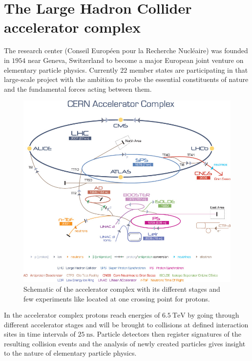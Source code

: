 \section{The Large Hadron Collider accelerator complex}\label{LHC}
The research center {\CERN} (Conseil Européen pour la Recherche Nucléaire) was founded in $1954$ near Geneva, Switzerland to become a major European joint venture on elementary particle physics. Currently $22$ member states are participating in that large-scale project with the ambition to probe the essential constituents of nature and the fundamental forces acting between them. \cite{CERNabout}\par
%
\begin{figure}[htbp]                                 
 \begin{center}                                       
  \includegraphics[width=0.8\linewidth]{figures/CERNKomplex.jpg} 
   \caption[Schematic of the {\CERN} accelerator complex.]{Schematic of the {\CERN} accelerator complex with its different stages and few experiments like {\ATLAS} located at one crossing point for protons. \cite{CERNKomplex}}
  \label{complex}                                     
 \end{center}
\end{figure}
%
In the accelerator complex protons reach energies of $\SI{6.5}{\tera\electronvolt}$ by going through different accelerator stages and will be brought to collisions at defined interaction sites in time intervals of $\SI{25}{\nano\second}$. Particle detectors then register signatures of the resulting collision events and the analysis of newly created particles gives insight to the nature of elementary particle physics.\newline 
